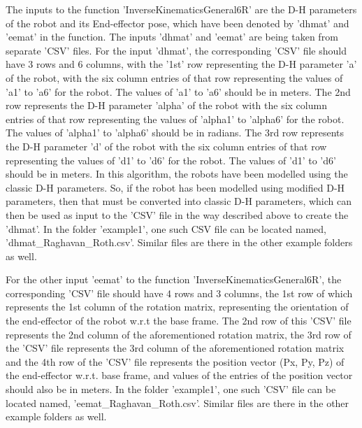 \begin{DoxyVerb}The inputs to the function 'InverseKinematicsGeneral6R' are the D-H parameters of the robot and its End-effector pose, which have been denoted by 'dhmat' and 'eemat'
in the function. The inputs 'dhmat' and 'eemat' are being taken from separate 'CSV' files. For the input 'dhmat', the corresponding 'CSV' file should 
have 3 rows and 6 columns, with the '1st' row representing the D-H parameter 'a' of the robot, with the six column entries of that row representing the 
values of 'a1' to 'a6' for the robot. The values of 'a1' to 'a6' should be in meters. The 2nd row represents the D-H parameter 'alpha' of the robot with 
the six column entries of that row representing the values of 'alpha1' to 'alpha6' for the robot. The values of 'alpha1' to 'alpha6' should be in radians. 
The 3rd row represents the D-H parameter 'd' of the robot with the six column entries of that row representing the values of 'd1' to 'd6' for the robot.
The values of 'd1' to 'd6' should be in meters. In this algorithm, the robots have been modelled using the classic D-H parameters. 
So, if the robot has been modelled using modified D-H parameters, then that must be converted into classic D-H parameters, which can then be used as input 
to the 'CSV' file in the way described above to create the 'dhmat'. In the folder 'example1', one such CSV file can be located named, 'dhmat_Raghavan_Roth.csv'.
Similar files are there in the other example folders as well.

For the other input 'eemat' to the function 'InverseKinematicsGeneral6R', the corresponding 'CSV' file should have 4 rows and 3 columns, the 1st row of which represents
the 1st column of the rotation matrix, representing the orientation of the end-effector  of the robot w.r.t the base frame. The 2nd row of this 'CSV' file
represents the 2nd column of the aforementioned rotation matrix, the 3rd row of the 'CSV' file represents the 3rd column of the aforementioned rotation matrix 
and the 4th row of the 'CSV' file represents the position vector (Px, Py, Pz) of the end-effector w.r.t. base frame, and values of the entries of the 
position vector should also be in meters. In the folder 'example1', one such 'CSV' file can be located named, 'eemat_Raghavan_Roth.csv'. Similar files are there 
in the other example folders as well.


\end{DoxyVerb}
